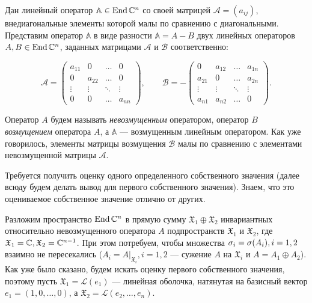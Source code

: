Дан линейный оператор $\mathbb{A} \in \operatorname{End}\mathbb{C}^n$ со своей матрицей $\mathscr{A} = \left( a_{ij} \right)$, внедиагональные элементы которой малы по сравнению с диагональными. Представим оператор $\mathbb{A}$ в виде разности $\mathbb{A} = A-B$ двух линейных операторов $\\A,B \in \operatorname{End}\mathbb{C}^n$, заданных матрицами $\mathcal{A} \text{ и } \mathcal{B}$ соответственно:

$$
	\mathcal{A} = \begin{pmatrix}
		a_{11} & 0      & \dots  & 0      \\
		0      & a_{22} & \dots  & 0      \\
		\vdots & \vdots & \ddots & \vdots \\
		0      & 0      & \dots  & a_{nn}
	\end{pmatrix},
	\qquad
	\mathcal{B} = -\begin{pmatrix}
		0      & a_{12} & \dots  & a_{1n} \\
		a_{21} & 0      & \dots  & a_{2n} \\
		\vdots & \vdots & \ddots & \vdots \\
		a_{n1} & a_{n2} & \dots  & 0
	\end{pmatrix}.
$$

Оператор $A$ будем называть {\em невозмущенным} оператором, оператор $B$ {\em возмущением} оператора $A$, а $\mathbb{A}$ --- возмущенным линейным оператором. Как уже говорилось, элементы матрицы возмущения $\mathcal{B}$ малы по сравнению с элементами невозмущенной матрицы $\mathcal{A}$.

Требуется получить оценку одного определенного собственного значения (далее всюду будем делать вывод для первого собственного значения). Знаем, что это оцениваемое собственное значение отлично от других.

Разложим пространство $\operatorname{End}\mathbb{C}^n$ в прямую сумму $\mathfrak{X}_1 \oplus \mathfrak{X}_2$ инвариантных относительно невозмущенного оператора $A$ подпространств $\mathfrak{X}_1$ и $\mathfrak{X}_2$, где $\mathfrak{X}_1 = \mathbb{C}, \mathfrak{X}_2 = \mathbb{C}^{n-1}$. При этом потребуем, чтобы множества $\sigma_i = \sigma(A_i),\\ i=1,2$ взаимно не пересекались ($A_i = \left. A \right|_{\mathfrak{X}_i}, i=1,2$ --- сужение $A$ на $\mathfrak{X}_i$ и $A = A_1 \oplus A_2$). Как уже было сказано, будем искать оценку первого собственного значения, поэтому пусть $\mathfrak{X}_1 = \mathcal{L}(e_1)$ --- линейная оболочка, натянутая на базисный вектор $e_1 = (1,0, \dots, 0)$, а $\mathfrak{X}_2 = \mathcal{L}(e_2, \dots, e_n)$.

